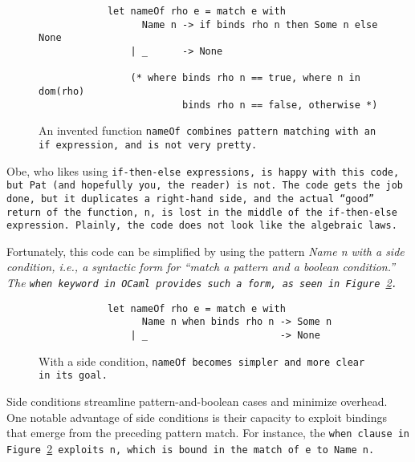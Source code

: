 \documentclass[manuscript,screen,review, 12pt]{acmart}
\begin{document}
    \begin{figure}[ht]
        \begin{verbatim}
            let nameOf rho e = match e with 
                  Name n -> if binds rho n then Some n else None
                | _      -> None

                (* where binds rho n == true, where n in dom(rho)
                         binds rho n == false, otherwise *)
            \end{verbatim}    
        \caption{An invented function \tt{nameOf} combines pattern matching with
        an \tt{if} expression, and is not very pretty.}    
        \label{fig:ifnameof}
    \end{figure}
    
    Obe, who likes using \tt{if-then-else} expressions, is happy with this code,
    but Pat (and hopefully you, the reader) is not. The code gets the job done,
    but it duplicates a right-hand side, and the actual “good” return of the
    function, \tt{n}, is lost in the middle of the \tt{if-then-else} expression.
    Plainly, the code does not look like the algebraic laws. 
    
    Fortunately, this code can be simplified by using the pattern \it{Name n}
    with a \it{side condition}, i.e., a syntactic form for “match a pattern
    \it{and} a boolean condition.” The \tt{when} keyword in OCaml
    provides such a form, as seen in Figure~\ref{fig:whennameof}.
        
        \begin{figure}[ht]
            \begin{verbatim}
            let nameOf rho e = match e with     
                  Name n when binds rho n -> Some n
                | _                       -> None  
                \end{verbatim}
            \caption{With a side condition, \tt{nameOf} becomes simpler and more
            clear in its goal.}
            \label{fig:whennameof}
        \end{figure}

        
    
    
    

    Side conditions streamline pattern-and-boolean cases and minimize overhead.
    One notable advantage of side conditions is their capacity to exploit
    bindings that emerge from the preceding pattern match. For instance, the
    \tt{when} clause in Figure~\ref{fig:whennameof} exploits \tt{n}, which is
    bound in the match of \tt{e} to \tt{Name n}.
\end{document}
